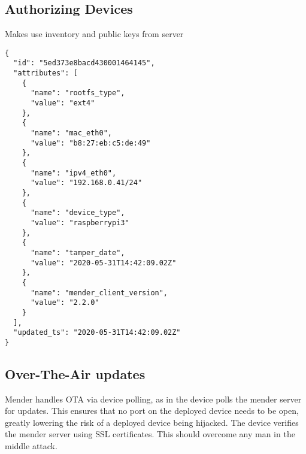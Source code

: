 \documentclass[../../main.tex]{subfiles}
\begin{document}
\subsection{Authorizing Devices}%
\label{sub:authorizing_devices}

Makes use inventory and public keys from server

\begin{verbatim}
{
  "id": "5ed373e8bacd430001464145",
  "attributes": [
    {
      "name": "rootfs_type",
      "value": "ext4"
    },
    {
      "name": "mac_eth0",
      "value": "b8:27:eb:c5:de:49"
    },
    {
      "name": "ipv4_eth0",
      "value": "192.168.0.41/24"
    },
    {
      "name": "device_type",
      "value": "raspberrypi3"
    },
    {
      "name": "tamper_date",
      "value": "2020-05-31T14:42:09.02Z"
    },
    {
      "name": "mender_client_version",
      "value": "2.2.0"
    }
  ],
  "updated_ts": "2020-05-31T14:42:09.02Z"
}

\end{verbatim}




\subsection{Over-The-Air updates}%
\label{sub:over_the_air_updates}

Mender handles OTA via device polling, as in the device polls the mender server for updates.
This ensures that no port on the deployed device needs to be open, greatly lowering the risk of
a deployed device being hijacked.
The device verifies the mender server using SSL certificates.
This should overcome any man in the middle attack.





%
%
%
%
	
\end{document}
